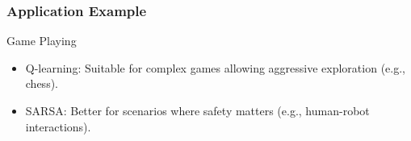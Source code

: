 \documentclass[aspectratio=169]{beamer}
\begin{document}
\begin{frame}[fragile]
    \frametitle{Application Example}
    \begin{block}{Game Playing}
        \begin{itemize}
            \item Q-learning: Suitable for complex games allowing aggressive exploration (e.g., chess).
            \item SARSA: Better for scenarios where safety matters (e.g., human-robot interactions).
        \end{itemize}
    \end{block}
\end{frame}
\end{document}
